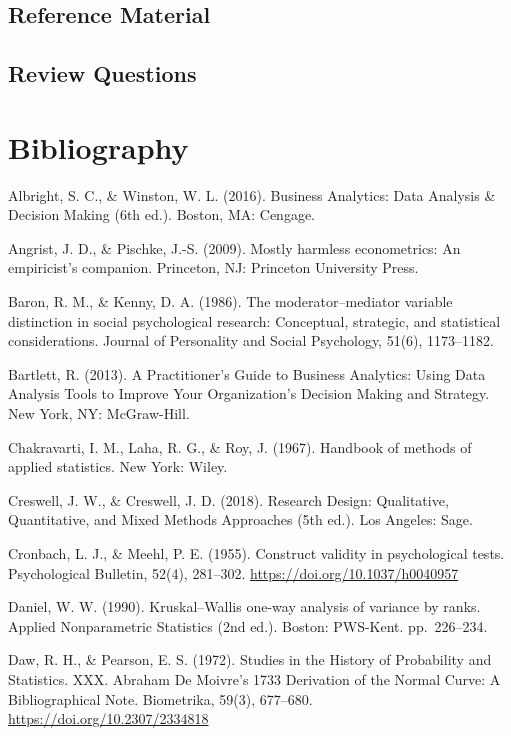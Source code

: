 \documentclass[]{book}
\begin{document}
\hypertarget{reference-material}{%
\section{Reference Material}\label{reference-material}}

\hypertarget{review-questions-14}{%
\section{Review Questions}\label{review-questions-14}}

\hypertarget{bibli}{%
\chapter{Bibliography}\label{bibli}}

Albright, S. C., \& Winston, W. L. (2016). Business Analytics: Data Analysis \& Decision Making (6th ed.). Boston, MA: Cengage.

Angrist, J. D., \& Pischke, J.-S. (2009). Mostly harmless econometrics: An empiricist's companion. Princeton, NJ: Princeton University Press.

Baron, R. M., \& Kenny, D. A. (1986). The moderator--mediator variable distinction in social psychological research: Conceptual, strategic, and statistical considerations. Journal of Personality and Social Psychology, 51(6), 1173--1182.

Bartlett, R. (2013). A Practitioner's Guide to Business Analytics: Using Data Analysis Tools to Improve Your Organization's Decision Making and Strategy. New York, NY: McGraw-Hill.

Chakravarti, I. M., Laha, R. G., \& Roy, J. (1967). Handbook of methods of applied statistics. New York: Wiley.

Creswell, J. W., \& Creswell, J. D. (2018). Research Design: Qualitative, Quantitative, and Mixed Methods Approaches (5th ed.). Los Angeles: Sage.

Cronbach, L. J., \& Meehl, P. E. (1955). Construct validity in psychological tests. Psychological Bulletin, 52(4), 281--302. \url{https://doi.org/10.1037/h0040957}

Daniel, W. W. (1990). Kruskal--Wallis one-way analysis of variance by ranks. Applied Nonparametric Statistics (2nd ed.). Boston: PWS-Kent. pp.~226--234.

Daw, R. H., \& Pearson, E. S. (1972). Studies in the History of Probability and Statistics. XXX. Abraham De Moivre's 1733 Derivation of the Normal Curve: A Bibliographical Note. Biometrika, 59(3), 677--680. \url{https://doi.org/10.2307/2334818}
\end{document}
